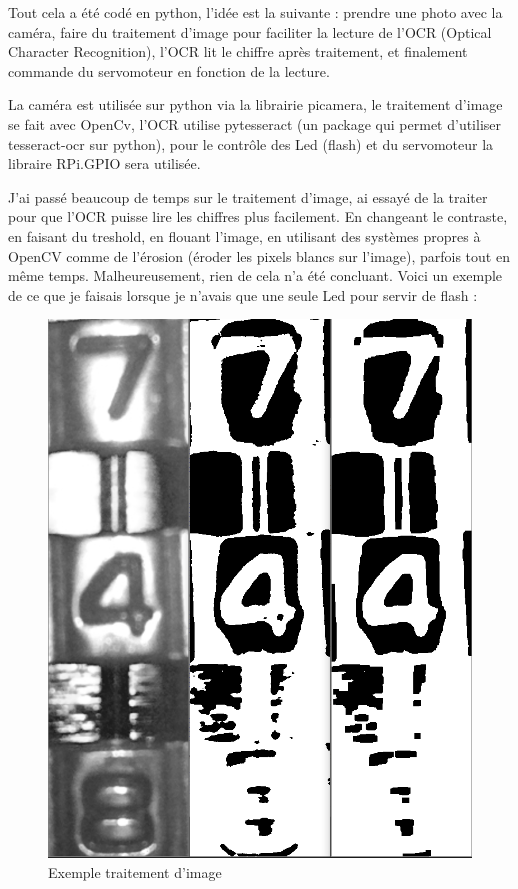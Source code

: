 \documentclass[twoside]{article}
\begin{document}
\begin{multicols}{2}
Tout cela a été codé en python, l'idée est la suivante : prendre une photo avec la caméra, faire du traitement d'image pour faciliter la lecture de l'OCR (Optical Character Recognition), l'OCR lit le chiffre après traitement, et finalement commande du servomoteur en fonction de la lecture.

La caméra est utilisée sur python via la librairie picamera, le traitement d'image se fait avec OpenCv, l'OCR utilise pytesseract (un package qui permet d'utiliser tesseract-ocr sur python), pour le contrôle des Led (flash) et du servomoteur la libraire RPi.GPIO sera utilisée.

J'ai passé beaucoup de temps sur le traitement d'image, ai essayé de la traiter pour que l'OCR puisse lire les chiffres plus facilement. En changeant le contraste, en faisant du treshold, en flouant l'image, en utilisant des systèmes propres à OpenCV comme de l'érosion (éroder les pixels blancs sur l'image), parfois tout en même temps. Malheureusement, rien de cela n'a été concluant. Voici un exemple de ce que je faisais lorsque je n'avais que une seule Led pour servir de flash : 

\begin{figure}[H]
\centering
\includegraphics[scale=0.3]{TraitementImage.png}
\caption{Exemple traitement d'image}
\end{figure}


\end{multicols}
\end{document}
